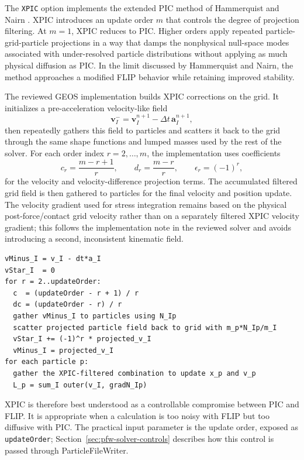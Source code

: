 The \texttt{XPIC} option implements the extended PIC method of Hammerquist and Nairn \cite{hammerquist2017xpic}.  XPIC introduces an update order $m$ that controls the degree of projection filtering.  At $m=1$, XPIC reduces to PIC.  Higher orders apply repeated particle-grid-particle projections in a way that damps the nonphysical null-space modes associated with under-resolved particle distributions without applying as much physical diffusion as PIC.  In the limit discussed by Hammerquist and Nairn, the method approaches a modified FLIP behavior while retaining improved stability.

The reviewed GEOS implementation builds XPIC corrections on the grid.  It initializes a pre-acceleration velocity-like field
\begin{equation}
  \boldsymbol{v}^{-}_I = \boldsymbol{v}^{n+1}_I-\Delta t\,\boldsymbol{a}^{n+1}_I,
  \label{eq:xpic-vminus}
\end{equation}
then repeatedly gathers this field to particles and scatters it back to the grid through the same shape functions and lumped masses used by the rest of the solver.  For each order index $r=2,\ldots,m$, the implementation uses coefficients
\begin{equation}
  c_r=\frac{m-r+1}{r},
  \qquad
  d_r=\frac{m-r}{r},
  \qquad
  \epsilon_r=(-1)^r,
  \label{eq:xpic-coefficients}
\end{equation}
for the velocity and velocity-difference projection terms.  The accumulated filtered grid field is then gathered to particles for the final velocity and position update.  The velocity gradient used for stress integration remains based on the physical post-force/contact grid velocity rather than on a separately filtered XPIC velocity gradient; this follows the implementation note in the reviewed solver and avoids introducing a second, inconsistent kinematic field.

\begin{lstlisting}[caption={XPIC update structure.},basicstyle=\ttfamily\small]
vMinus_I = v_I - dt*a_I
vStar_I  = 0
for r = 2..updateOrder:
  c  = (updateOrder - r + 1) / r
  dc = (updateOrder - r) / r
  gather vMinus_I to particles using N_Ip
  scatter projected particle field back to grid with m_p*N_Ip/m_I
  vStar_I += (-1)^r * projected_v_I
  vMinus_I = projected_v_I
for each particle p:
  gather the XPIC-filtered combination to update x_p and v_p
  L_p = sum_I outer(v_I, gradN_Ip)
\end{lstlisting}

XPIC is therefore best understood as a controllable compromise between PIC and FLIP.  It is appropriate when a calculation is too noisy with FLIP but too diffusive with PIC.  The practical input parameter is the update order, exposed as \texttt{updateOrder}; Section~\ref{sec:pfw-solver-controls} describes how this control is passed through ParticleFileWriter.

